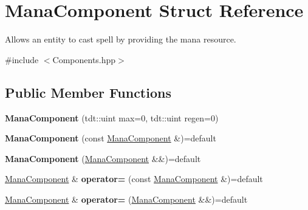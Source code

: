 \hypertarget{struct_mana_component}{}\section{Mana\+Component Struct Reference}
\label{struct_mana_component}


Allows an entity to cast spell by providing the mana resource.  




{\ttfamily \#include $<$Components.\+hpp$>$}

\subsection*{Public Member Functions}
\begin{DoxyCompactItemize}
\item 
{\bfseries Mana\+Component} (tdt\+::uint max=0, tdt\+::uint regen=0)\hypertarget{struct_mana_component_a94a95afde3be851a89d547ecfd830d62}{}\label{struct_mana_component_a94a95afde3be851a89d547ecfd830d62}

\item 
{\bfseries Mana\+Component} (const \hyperlink{struct_mana_component}{Mana\+Component} \&)=default\hypertarget{struct_mana_component_a124d26f4d2be0480f7bbe09072804c59}{}\label{struct_mana_component_a124d26f4d2be0480f7bbe09072804c59}

\item 
{\bfseries Mana\+Component} (\hyperlink{struct_mana_component}{Mana\+Component} \&\&)=default\hypertarget{struct_mana_component_acc37470e5cf81baa2d84e8aa50c3f019}{}\label{struct_mana_component_acc37470e5cf81baa2d84e8aa50c3f019}

\item 
\hyperlink{struct_mana_component}{Mana\+Component} \& {\bfseries operator=} (const \hyperlink{struct_mana_component}{Mana\+Component} \&)=default\hypertarget{struct_mana_component_a82cbcc86aee470a7691c9af4b3d6d43b}{}\label{struct_mana_component_a82cbcc86aee470a7691c9af4b3d6d43b}

\item 
\hyperlink{struct_mana_component}{Mana\+Component} \& {\bfseries operator=} (\hyperlink{struct_mana_component}{Mana\+Component} \&\&)=default\hypertarget{struct_mana_component_a7e15cdd6bc9185b94355557ffe9ec79d}{}\label{struct_mana_component_a7e15cdd6bc9185b94355557ffe9ec79d}

\end{DoxyCompactItemize}
